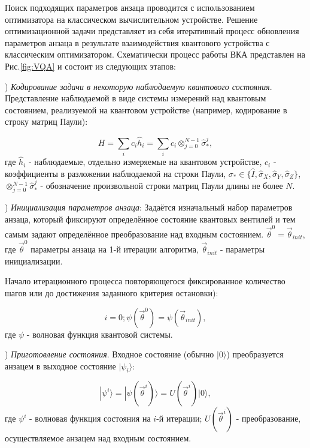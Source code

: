 \documentclass[14pt]{extarticle}
\begin{document}
\qquad Поиск подходящих параметров анзаца проводится с использованием оптимизатора на классическом вычислительном устройстве. Решение оптимизационной задачи представляет из себя итеративный процесс обновления параметров анзаца в результате взаимодействия квантового устройства с классическим оптимизатором. Схематически процесс работы ВКА представлен на Рис.\ref{fig:VQA} и состоит из следующих этапов:

) \emph{Кодирование задачи в некоторую наблюдаемую квантового состояния}. Представление наблюдаемой в виде системы измерений над квантовым состоянием, реализуемой на квантовом устройстве (например, кодирование в строку матриц Паули):

\begin{equation}
 H=\sum_{i} c_{i} \hat h_{i} = \sum_{i} c_{i} \otimes^{N-1}_{j = 0} \hat \sigma^{j}_{*},
\end{equation} где $\hat h_{i}$ - наблюдаемые, отдельно измеряемые на квантовом устройстве, $c_{i}$ - коэффициенты в разложении наблюдаемой на строки Паули, $ \sigma_{*} \in \{\hat I,\hat \sigma_{X}, \hat \sigma_{Y}, \hat \sigma_{Z}  \} $, $\otimes^{N-1}_{j = 0} \hat \sigma^{j}_{*}$ - обозначение произвольной строки матриц Паули длины не более $N$.

) \emph{Инициализация параметров анзаца}:
Задаётся изначальный набор параметров анзаца, который фиксируют определённое состояние квантовых вентилей и тем самым задают определённое преобразование над входным состоянием. $\vec{\theta}^0 = \vec{\theta}_{init}$, где $\vec{\theta}^0$ параметры анзаца на 1-й итерации алгоритма, $\vec{\theta}_{init}$ - параметры инициализации.

\qquad Начало итерационного процесса повторяющегося фиксированное количество шагов или до достижения заданного критерия остановки):

\begin{equation}
i = 0; \psi(\vec{\theta}^{0}) = \psi(\vec{\theta}_{init}),
\end{equation} где $\psi$ - волновая функция квантовой системы.


) \emph{Приготовление состояния}. Входное состояние (обычно $|0 \rangle$) преобразуется анзацем в выходное состояние $|\psi_{i}\rangle$:


\begin{equation}
|\psi^{i}\rangle = |\psi (\vec{\theta}^{i})\rangle = U(\vec{\theta}^{i}) |0 \rangle,
\end{equation} где $\psi^{i}$ - волновая функция состояния на $i$-й итерации; $U(\vec{\theta}^{i})$ - преобразование, осуществляемое анзацем над входным состоянием.
\end{document}
